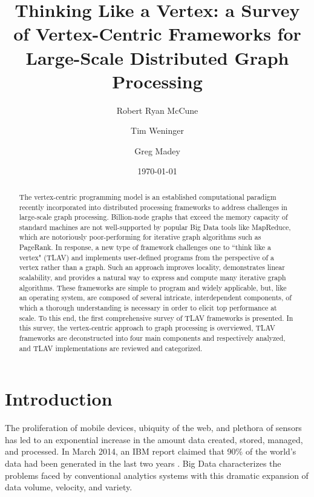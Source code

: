 \documentclass[reprint,twocolumn,showpacs,preprintnumbers,amsmath, aps,pre,amssymb]{revtex4-1}
\begin{document}
\label{firstpage}


\title{Thinking Like a Vertex: a Survey of Vertex-Centric Frameworks for Large-Scale Distributed Graph Processing}
\author{Robert Ryan McCune}
\author{Tim Weninger}
\author{Greg Madey}
\date{\today}


\begin{abstract}
The vertex-centric programming model is an established computational paradigm recently incorporated into distributed processing frameworks to address challenges in large-scale graph processing.  Billion-node graphs that exceed the memory capacity of standard machines are not well-supported by popular Big Data tools like MapReduce, which are notoriously poor-performing for iterative graph algorithms such as PageRank.  In response, a new type of framework challenges one to ``think like a vertex" (TLAV) and implements user-defined programs from the perspective of a vertex rather than a graph.  Such an approach improves locality, demonstrates linear scalability, and provides a natural way to express and compute many iterative graph algorithms.  These frameworks are simple to program and widely applicable, but, like an operating system, are composed of several intricate, interdependent components, of which a thorough understanding is necessary in order to elicit top performance at scale.  To this end, the first comprehensive survey of TLAV frameworks is presented.  In this survey, the vertex-centric approach to graph processing is overviewed, TLAV frameworks are deconstructed into four main components and respectively analyzed, and TLAV implementations are reviewed and categorized.
\end{abstract}

\maketitle

\section{Introduction}
\label{sec:intro}
The proliferation of mobile devices,  ubiquity of the web, and plethora of sensors has led to an exponential increase in the amount data created, stored, managed, and processed.  In March 2014, an IBM report claimed that 90\% of the world's data had been generated in the last two years \cite{ibmbigdata}.  Big Data characterizes the problems faced by conventional analytics systems with this dramatic expansion of data volume, velocity, and variety.
\end{document}
